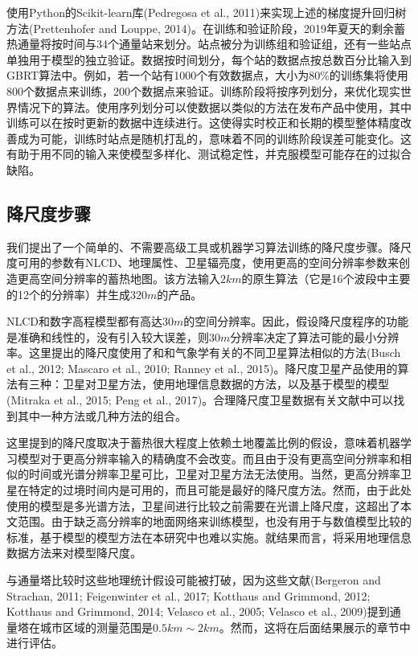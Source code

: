 \documentclass[3p,times]{elsarticle}
\begin{document}
使用Python的Scikit-learn库(Pedregosa et al., 2011)来实现上述的梯度提升回归树方法(Prettenhofer and Louppe, 2014)。在训练和验证阶段，2019年夏天的剩余蓄热通量将按时间与34个通量站来划分。站点被分为训练组和验证组，还有一些站点单独用于模型的独立验证。数据按时间划分，每个站的数据点按总数百分比输入到GBRT算法中。例如，若一个站有1000个有效数据点，大小为80\%的训练集将使用800个数据点来训练，200个数据点来验证。训练阶段将按序列划分，来优化现实世界情况下的算法。使用序列划分可以使数据以类似的方法在发布产品中使用，其中训练可以在按时更新的数据中连续进行。这使得实时校正和长期的模型整体精度改善成为可能，训练时站点是随机打乱的，意味着不同的训练阶段误差可能变化。这有助于用不同的输入来使模型多样化、测试稳定性，并克服模型可能存在的过拟合缺陷。

\subsection{降尺度步骤}

我们提出了一个简单的、不需要高级工具或机器学习算法训练的降尺度步骤。降尺度可用的参数有NLCD、地理属性、卫星辐亮度，使用更高的空间分辨率参数来创造更高空间分辨率的蓄热地图。该方法输入$2km$的原生算法（它是16个波段中主要的12个的分辨率）并生成$320m$的产品。

NLCD和数字高程模型都有高达$30m$的空间分辨率。因此，假设降尺度程序的功能是准确和线性的，没有引入较大误差，则$30m$分辨率决定了算法可能的最小分辨率。这里提出的降尺度使用了和和气象学有关的不同卫星算法相似的方法(Busch et al., 2012; Mascaro et al., 2010; Ranney et al., 2015)。降尺度卫星产品使用的算法有三种：卫星对卫星方法，使用地理信息数据的方法，以及基于模型的模型(Mitraka et al., 2015; Peng et al., 2017)。合理降尺度卫星数据有关文献中可以找到其中一种方法或几种方法的组合。

这里提到的降尺度取决于蓄热很大程度上依赖土地覆盖比例的假设，意味着机器学习模型对于更高分辨率输入的精确度不会改变。而且由于没有更高空间分辨率和相似的时间或光谱分辨率卫星可比，卫星对卫星方法无法使用。当然，更高分辨率卫星在特定的过境时间内是可用的，而且可能是最好的降尺度方法。然而，由于此处使用的模型是多光谱方法，卫星间进行比较之前需要在光谱上降尺度，这超出了本文范围。由于缺乏高分辨率的地面网络来训练模型，也没有用于与数值模型比较的标准，基于模型的模型方法在本研究中也难以实施。就结果而言，将采用地理信息数据方法来对模型降尺度。

与通量塔比较时这些地理统计假设可能被打破，因为这些文献(Bergeron and Strachan, 2011; Feigenwinter et al., 2017; Kotthaus and Grimmond, 2012; Kotthaus and Grimmond, 2014; Velasco et al., 2005; Velasco et al., 2009)提到通量塔在城市区域的测量范围是$0.5km\sim2km$。然而，这将在后面结果展示的章节中进行评估。
\end{document}
